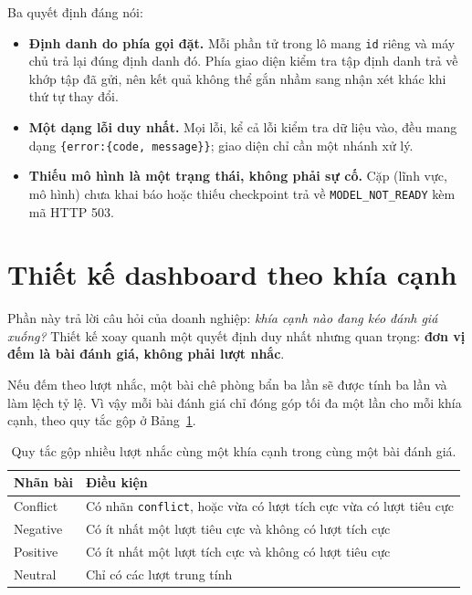 \documentclass[12pt,a4paper]{report}
\newcommand{\code}[1]{\texttt{#1}}
\begin{document}
Ba quyết định đáng nói:

\begin{itemize}
  \item \textbf{Định danh do phía gọi đặt.} Mỗi phần tử trong lô mang \code{id} riêng và máy chủ trả lại đúng định danh
        đó. Phía giao diện kiểm tra tập định danh trả về khớp tập đã gửi, nên kết quả không thể gắn nhầm sang nhận xét
        khác khi thứ tự thay đổi.
  \item \textbf{Một dạng lỗi duy nhất.} Mọi lỗi, kể cả lỗi kiểm tra dữ liệu vào, đều mang dạng \code{\{error:\{code,
        message\}\}}; giao diện chỉ cần một nhánh xử lý.
  \item \textbf{Thiếu mô hình là một trạng thái, không phải sự cố.} Cặp (lĩnh vực, mô hình) chưa khai báo hoặc thiếu
        checkpoint trả về \code{MODEL\_NOT\_READY} kèm mã HTTP 503.
\end{itemize}

\section{Thiết kế dashboard theo khía cạnh}
\label{sec:thietkedashboard}

Phần này trả lời câu hỏi của doanh nghiệp: \emph{khía cạnh nào đang kéo đánh giá xuống?} Thiết kế xoay quanh một quyết
định duy nhất nhưng quan trọng: \textbf{đơn vị đếm là bài đánh giá, không phải lượt nhắc}.

Nếu đếm theo lượt nhắc, một bài chê phòng bẩn ba lần sẽ được tính ba lần và làm lệch tỷ lệ. Vì vậy mỗi bài đánh giá chỉ
đóng góp tối đa một lần cho mỗi khía cạnh, theo quy tắc gộp ở Bảng~\ref{tab:quytac}.

\begin{table}[H]
\centering
\caption{Quy tắc gộp nhiều lượt nhắc cùng một khía cạnh trong cùng một bài đánh giá.}
\label{tab:quytac}
\begin{tabularx}{\linewidth}{@{}lX@{}}
\toprule
\textbf{Nhãn bài} & \textbf{Điều kiện} \\
\midrule
Conflict & Có nhãn \code{conflict}, hoặc vừa có lượt tích cực vừa có lượt tiêu cực \\
Negative & Có ít nhất một lượt tiêu cực và không có lượt tích cực \\
Positive & Có ít nhất một lượt tích cực và không có lượt tiêu cực \\
Neutral  & Chỉ có các lượt trung tính \\
\bottomrule
\end{tabularx}
\end{table}
\end{document}

